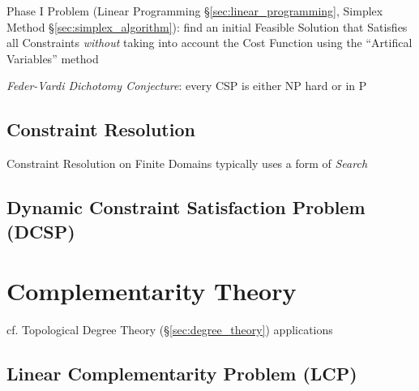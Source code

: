 \fist Phase I Problem (Linear Programming \S\ref{sec:linear_programming},
Simplex Method \S\ref{sec:simplex_algorithm}): find an initial Feasible
Solution that Satisfies all Constraints \emph{without} taking into account the
Cost Function using the ``Artifical Variables'' method

\emph{Feder-Vardi Dichotomy Conjecture}: every CSP is either NP hard or in P



\subsection{Constraint Resolution}\label{sec:constraint_resolution}

Constraint Resolution on Finite Domains typically uses a form of \emph{Search}



\subsection{Dynamic Constraint Satisfaction Problem (DCSP)}\label{sec:dcsp}



\section{Complementarity Theory}\label{sec:complementarity_theory}

cf. Topological Degree Theory (\S\ref{sec:degree_theory}) applications



\subsection{Linear Complementarity Problem (LCP)}
\label{sec:linear_complementarity}


